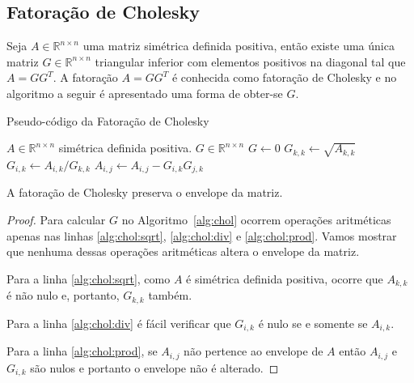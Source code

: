 \subsection{Fatoração de Cholesky}
Seja $A \in \mathbb{R}^{n \times n}$ uma matriz simétrica definida positiva, então existe
uma única matriz $G \in \mathbb{R}^{n \times n}$ triangular inferior com
elementos positivos na diagonal tal que $A = G G^T$. A fatoração $A = G G^T$ é
conhecida como fatoração de Cholesky e no algoritmo a seguir é apresentado
uma forma de obter-se $G$.
\begin{algorithm}[hbt]
    \caption{Pseudo-código da Fatoração de Cholesky}
    \label{alg:chol}
    \begin{algorithmic}[1]
        \REQUIRE $A \in \mathbb{R}^{n \times n}$ simétrica definida positiva.
        \ENSURE $G \in \mathbb{R}^{n \times n}$
        \STATE $G \longleftarrow 0$ 
            \STATE $G_{k,k} \longleftarrow \sqrt{A_{k,k}}$ \label{alg:chol:sqrt}
                \STATE $G_{i,k} \longleftarrow A_{i,k} / G_{k,k}$
                \label{alg:chol:div}
            \ENDFOR
                    \STATE $A_{i,j} \longleftarrow A_{i,j} - G_{i,k} G_{j,k}$
                    \label{alg:chol:prod}
                \ENDFOR
            \ENDFOR
        \ENDFOR
    \end{algorithmic}
\end{algorithm}

\begin{prop}
    \label{prop:pres:env}
    A fatoração de Cholesky preserva o envelope da matriz.
\end{prop}
\begin{proof}
    Para calcular $G$ no Algoritmo~\ref{alg:chol} ocorrem operações aritméticas
    apenas nas linhas \ref{alg:chol:sqrt}, \ref{alg:chol:div} e
    \ref{alg:chol:prod}. Vamos mostrar que nenhuma dessas operações aritméticas
    altera o envelope da matriz.

    Para a linha \ref{alg:chol:sqrt}, como $A$ é simétrica definida positiva,
    ocorre que $A_{k,k}$ é não nulo e, portanto, $G_{k,k}$ também.

    Para a linha \ref{alg:chol:div} é fácil verificar que $G_{i,k}$ é nulo se e
    somente se $A_{i,k}$.

    Para a linha \ref{alg:chol:prod}, se $A_{i,j}$ não pertence ao envelope de $A$
    então $A_{i,j}$ e $G_{i,k}$ são nulos e portanto o envelope não é alterado.
\end{proof}

